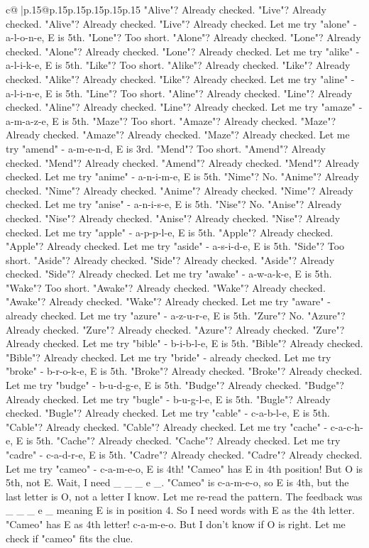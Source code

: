 \documentclass{article}
\begin{document}
{\begin{supertabular}{c@{$\;$}|p{.15\linewidth}@{}p{.15\linewidth}p{.15\linewidth}p{.15\linewidth}p{.15\linewidth}p{.15\linewidth}}
{{{"Alive"? Already checked. "Live"? Already checked. "Alive"? Already checked. "Live"? Already checked. Let me try "alone" {-} a{-}l{-}o{-}n{-}e, E is 5th. "Lone"? Too short. "Alone"? Already checked. "Lone"? Already checked. "Alone"? Already checked. "Lone"? Already checked. Let me try "alike" {-} a{-}l{-}i{-}k{-}e, E is 5th. "Like"? Too short. "Alike"? Already checked. "Like"? Already checked. "Alike"? Already checked. "Like"? Already checked. Let me try "aline" {-} a{-}l{-}i{-}n{-}e, E is 5th. "Line"? Too short. "Aline"? Already checked. "Line"? Already checked. "Aline"? Already checked. "Line"? Already checked. Let me try "amaze" {-} a{-}m{-}a{-}z{-}e, E is 5th. "Maze"? Too short. "Amaze"? Already checked. "Maze"? Already checked. "Amaze"? Already checked. "Maze"? Already checked. Let me try "amend" {-} a{-}m{-}e{-}n{-}d, E is 3rd. "Mend"? Too short. "Amend"? Already checked. "Mend"? Already checked. "Amend"? Already checked. "Mend"? Already checked. Let me try "anime" {-} a{-}n{-}i{-}m{-}e, E is 5th. "Nime"? No. "Anime"? Already checked. "Nime"? Already checked. "Anime"? Already checked. "Nime"? Already checked. Let me try "anise" {-} a{-}n{-}i{-}s{-}e, E is 5th. "Nise"? No. "Anise"? Already checked. "Nise"? Already checked. "Anise"? Already checked. "Nise"? Already checked. Let me try "apple" {-} a{-}p{-}p{-}l{-}e, E is 5th. "Apple"? Already checked. "Apple"? Already checked. Let me try "aside" {-} a{-}s{-}i{-}d{-}e, E is 5th. "Side"? Too short. "Aside"? Already checked. "Side"? Already checked. "Aside"? Already checked. "Side"? Already checked. Let me try "awake" {-} a{-}w{-}a{-}k{-}e, E is 5th. "Wake"? Too short. "Awake"? Already checked. "Wake"? Already checked. "Awake"? Already checked. "Wake"? Already checked. Let me try "aware" {-} already checked. Let me try "azure" {-} a{-}z{-}u{-}r{-}e, E is 5th. "Zure"? No. "Azure"? Already checked. "Zure"? Already checked. "Azure"? Already checked. "Zure"? Already checked. Let me try "bible" {-} b{-}i{-}b{-}l{-}e, E is 5th. "Bible"? Already checked. "Bible"? Already checked. Let me try "bride" {-} already checked. Let me try "broke" {-} b{-}r{-}o{-}k{-}e, E is 5th. "Broke"? Already checked. "Broke"? Already checked. Let me try "budge" {-} b{-}u{-}d{-}g{-}e, E is 5th. "Budge"? Already checked. "Budge"? Already checked. Let me try "bugle" {-} b{-}u{-}g{-}l{-}e, E is 5th. "Bugle"? Already checked. "Bugle"? Already checked. Let me try "cable" {-} c{-}a{-}b{-}l{-}e, E is 5th. "Cable"? Already checked. "Cable"? Already checked. Let me try "cache" {-} c{-}a{-}c{-}h{-}e, E is 5th. "Cache"? Already checked. "Cache"? Already checked. Let me try "cadre" {-} c{-}a{-}d{-}r{-}e, E is 5th. "Cadre"? Already checked. "Cadre"? Already checked. Let me try "cameo" {-} c{-}a{-}m{-}e{-}o, E is 4th! "Cameo" has E in 4th position! But O is 5th, not E. Wait, I need \_ \_ \_ e \_. "Cameo" is c{-}a{-}m{-}e{-}o, so E is 4th, but the last letter is O, not a letter I know. Let me re{-}read the pattern. The feedback was \_ \_ \_ e \_ meaning E is in position 4. So I need words with E as the 4th letter. "Cameo" has E as 4th letter! c{-}a{-}m{-}e{-}o. But I don't know if O is right. Let me check if "cameo" fits the clue. }}}
\end{supertabular}}
\end{document}
